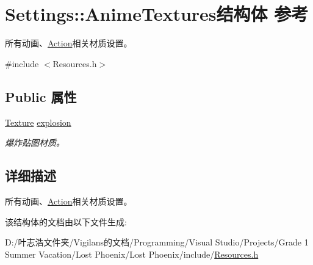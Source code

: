 \hypertarget{struct_settings_1_1_anime_textures}{}\section{Settings\+:\+:Anime\+Textures结构体 参考}
\label{struct_settings_1_1_anime_textures}


所有动画、\hyperlink{class_action}{Action}相关材质设置。  




{\ttfamily \#include $<$Resources.\+h$>$}

\subsection*{Public 属性}
\begin{DoxyCompactItemize}
\item 
\mbox{\label{struct_settings_1_1_anime_textures_ac7d7f8216a2c1f3f06dfcb59d6ed7a10}} 
\hyperlink{struct_texture}{Texture} \hyperlink{struct_settings_1_1_anime_textures_ac7d7f8216a2c1f3f06dfcb59d6ed7a10}{explosion}
\begin{DoxyCompactList}\small\item\em 爆炸贴图材质。 \end{DoxyCompactList}\end{DoxyCompactItemize}


\subsection{详细描述}
所有动画、\hyperlink{class_action}{Action}相关材质设置。 



该结构体的文档由以下文件生成\+:\begin{DoxyCompactItemize}
\item 
D\+:/叶志浩文件夹/\+Vigilans的文档/\+Programming/\+Visual Studio/\+Projects/\+Grade 1 Summer Vacation/\+Lost Phoenix/\+Lost Phoenix/include/\hyperlink{_resources_8h}{Resources.\+h}\end{DoxyCompactItemize}
